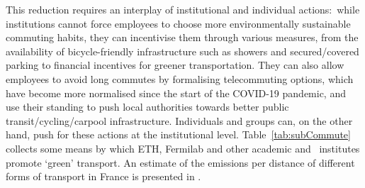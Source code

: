 \documentclass[../SustainableHEP.tex]{subfiles}
\begin{document}
This reduction requires an interplay of institutional and individual actions:\ while institutions cannot force employees to choose more environmentally sustainable commuting habits, they can incentivise them through various measures, from the availability of bicycle-friendly infrastructure such as showers and secured/covered parking to financial incentives for greener transportation. They can also allow employees to avoid long commutes by formalising telecommuting options, which have become more normalised since the start of the COVID-19 pandemic, and use their standing to push local authorities towards better public transit/cycling/carpool infrastructure. Individuals and groups can, on the other hand, push for these actions at the institutional level. Table~\ref{tab:subCommute} collects some means by which ETH, Fermilab and other academic and \ACR\ institutes promote `green' transport. An estimate of the emissions per distance
of different forms of transport in France is presented in .

\end{document}
